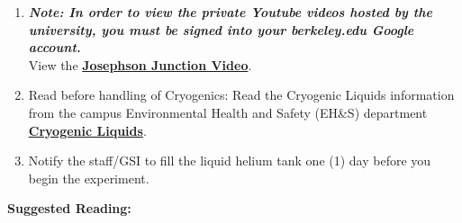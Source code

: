 \documentclass{../lab}
\begin{document}
\begin{enumerate}
    \item \emph{\textbf{Note: In order to view the private Youtube videos hosted by the university, you must be signed into your berkeley.edu Google account.}}\\
    View the \href{http://youtu.be/Z9vBPQrG0U4}{\textbf{Josephson Junction Video}}.

    \item Read before handling of Cryogenics: Read the Cryogenic Liquids information from the campus Environmental Health and Safety (EH\&S) department \href{http://experimentationlab.berkeley.edu/sites/default/files/SHE/77cryogenic.pdf}{\textbf{Cryogenic Liquids}}.

    \item Notify the staff/GSI to fill the liquid helium tank one (1) day before you begin the experiment.

\end{enumerate}

\noindent\textbf{Suggested Reading:}
\end{document}
